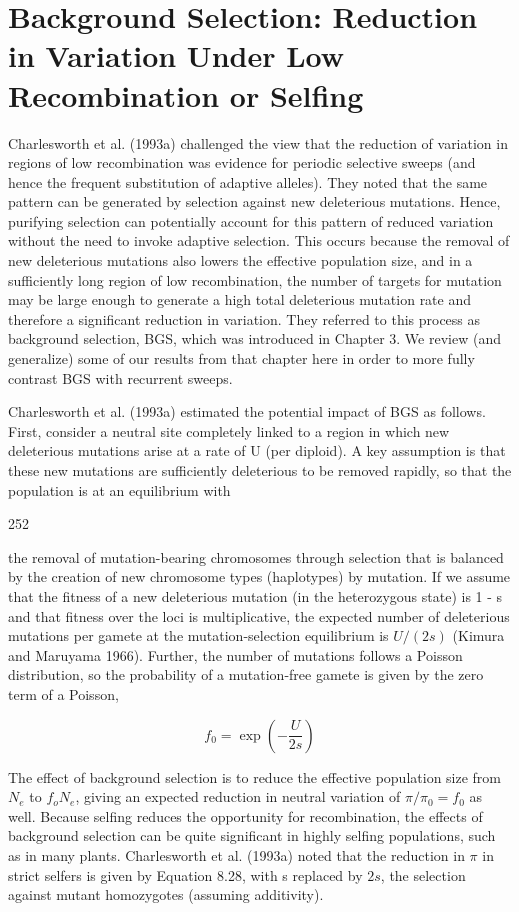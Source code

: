 \documentclass{article}
\begin{document}
\section{Background Selection: Reduction in Variation Under Low Recombination or Selfing}
Charlesworth et al. (1993a) challenged the view that the reduction of variation in regions of low recombination was evidence for periodic selective sweeps (and hence the frequent substitution of adaptive alleles). They noted that the same pattern can be generated by selection against new deleterious mutations. Hence, purifying selection can potentially account for this pattern of reduced variation without the need to invoke adaptive selection. This occurs because the removal of new deleterious mutations also lowers the effective population size, and in a sufficiently long region of low recombination, the number of targets for mutation may be large enough to generate a high total deleterious mutation rate and therefore a significant reduction in variation. They referred to this process as background selection, BGS, which was introduced in Chapter 3. We review (and generalize) some of our results from that chapter here in order to more fully contrast BGS with recurrent sweeps.

Charlesworth et al. (1993a) estimated the potential impact of BGS as follows. First, consider a neutral site completely linked to a region in which new deleterious mutations arise at a rate of U (per diploid). A key assumption is that these new mutations are sufficiently deleterious to be removed rapidly, so that the population is at an equilibrium with

252

the removal of mutation-bearing chromosomes through selection that is balanced by the creation of new chromosome types (haplotypes) by mutation. If we assume that the fitness of a new deleterious mutation (in the heterozygous state) is 1 - s and that fitness over the loci is multiplicative, the expected number of deleterious mutations per gamete at the mutation-selection equilibrium is  $ U/(2s) $ (Kimura and Maruyama 1966). Further, the number of mutations follows a Poisson distribution, so the probability of a mutation-free gamete is given by the zero term of a Poisson,

\begin{equation}
f_{0}=\exp\left(-\frac{U}{2s}\right)
\tag{8.28}
\label{eq:8_28}
\end{equation}

The effect of background selection is to reduce the effective population size from  $ N_e $ to  $ f_o N_e $, giving an expected reduction in neutral variation of  $ \pi/\pi_0 = f_0 $ as well. Because selfing reduces the opportunity for recombination, the effects of background selection can be quite significant in highly selfing populations, such as in many plants. Charlesworth et al. (1993a) noted that the reduction in  $ \pi $ in strict selfers is given by Equation 8.28, with s replaced by  $ 2s $, the selection against mutant homozygotes (assuming additivity).
\end{document}
